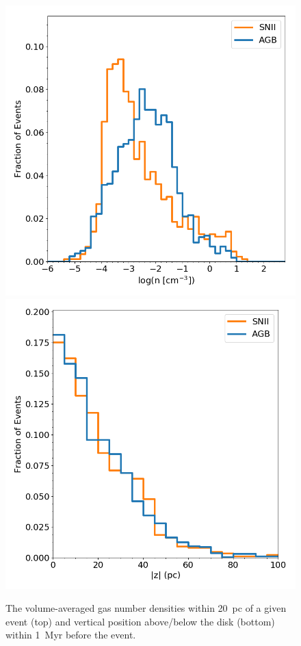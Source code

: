 \begin{figure}
\centering
\includegraphics[width=0.95\linewidth]{figures/ch3/SE_density}\\
\includegraphics[width=0.95\linewidth]{figures/ch3/SE_z}
\caption{The volume-averaged gas number densities within 20~pc of a given event (top) and vertical position above/below the disk (bottom) within 1~Myr before the event.}
\label{fig:spatial distribution}
\end{figure}


